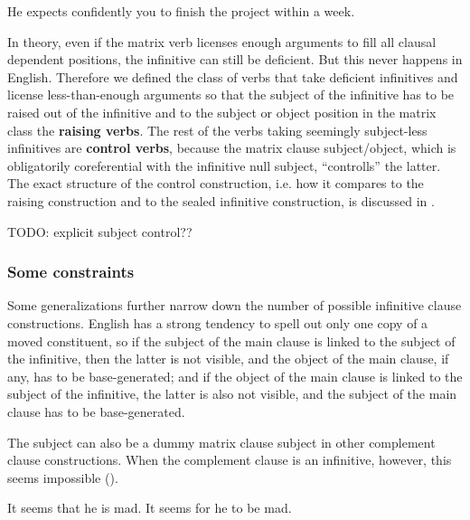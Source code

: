 \documentclass[UTF8, a4paper, oneside, scheme=plain, 12pt]{ctexbook}
\newcommand*{\concept}[1]{\textbf{#1}}
\begin{document}
\begin{exe}
    \ex *He expects confidently you to finish the project within a week.
\end{exe}

In theory, even if the matrix verb licenses enough arguments 
to fill all clausal dependent positions, 
the infinitive can still be deficient.
But this never happens in English. 
Therefore we defined the class of verbs that take deficient infinitives 
and license less-than-enough arguments 
so that the subject of the infinitive has to be raised out of the infinitive 
and to the subject or object position in the matrix class
the \concept{raising verbs}.
The rest of the verbs taking seemingly subject-less infinitives are \concept{control verbs}, 
because the matrix clause subject/object, 
which is obligatorily coreferential with the infinitive null subject, 
``controlls'' the latter.
The exact structure of the control construction, 
i.e. how it compares to the raising construction and to the sealed infinitive construction, 
is discussed in .

TODO: explicit subject control??

\subsubsection{Some constraints}

Some generalizations further narrow down 
the number of possible infinitive clause constructions.
English has a strong tendency to spell out only one copy of a moved constituent,
so if the subject of the main clause is linked to the subject of the infinitive,
then the latter is not visible,
and the object of the main clause, if any, has to be base-generated;
and if the object of the main clause is linked to the subject of the infinitive,
the latter is also not visible,
and the subject of the main clause has to be base-generated.

The subject can also be a dummy matrix clause subject in other complement clause constructions.
When the complement clause is an infinitive, however, 
this seems impossible ().

\begin{exe}
    \ex\label{ex:complement.infinitive.no-dummy-subject}  \begin{xlist}
        \ex It seems that he is mad.
        \ex *It seems for he to be mad.
    \end{xlist}
\end{exe}
\end{document}
